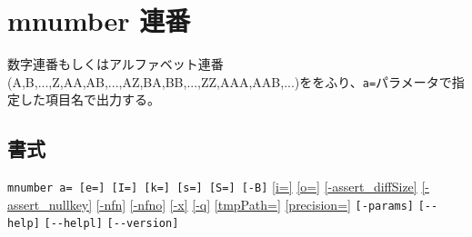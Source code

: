 
%

\section{mnumber 連番\label{sect:mnumber}}
数字連番もしくはアルファベット連番(A,B,...,Z,AA,AB,...,AZ,BA,BB,...,ZZ,AAA,AAB,...)ををふり、\verb|a=|パラメータで指定した項目名で出力する。

\subsection*{書式}
\verb|mnumber a= [e=] [I=] [k=] [s=] [S=] [-B]|
\hyperref[sect:option_i]{[i=]}
\hyperref[sect:option_o]{[o=]}
\hyperref[sect:option_assert_diffSize]{[-assert\_diffSize]}
\hyperref[sect:option_assert_nullkey]{[-assert\_nullkey]}
\hyperref[sect:option_nfn]{[-nfn]} 
\hyperref[sect:option_nfno]{[-nfno]}  
\hyperref[sect:option_x]{[-x]}
\hyperref[sect:option_q]{[-q]}
\hyperref[sect:option_option_tmppath]{[tmpPath=]}
\hyperref[sect:option_precision]{[precision=]}
\verb|[-params]|
\verb|[--help]|
\verb|[--helpl]|
\verb|[--version]|\\

